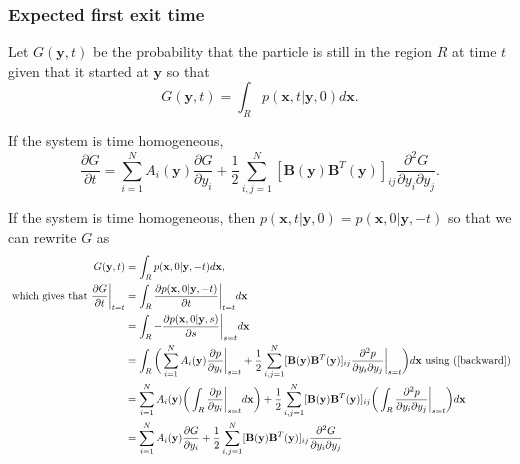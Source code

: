 \documentclass{article}
\newcommand{\mb}{\mathbf}
\begin{document}
\subsubsection{Expected first exit time }
Let $G({\mathbf y},t)$ be the probability that the particle is still in the region $R$ at time $t$ given that it started at ${\mathbf y}$ so that $$G({\mathbf y},t)=\int_Rp({\mathbf x},t|{\mathbf y},0)d{\mathbf x}.$$  

\begin{claim} If the system is time homogeneous,
\begin{equation}
\frac{\partial G}{\partial t}=\sum_{i=1}^NA_i({\mb y})\frac{\partial G}{\partial y_i}+\frac{1}{2}\sum_{i,j=1}^N[{\mb B}({\mb y}){\mb B}^T({\mb y})]_{ij}\frac{\partial^2 G}{\partial y_i\partial y_j}. \label{Geq}
\end{equation}
\end{claim}
\begin{pf}
If the system is time homogeneous, then $p({\mb x},t|{\mb y},0)=p({\mb x},0|{\mb y},-t)$ so that we can rewrite $G$ as 
\begin{align*}
G({\mb y},t)&=\int_Rp({\mb x},0|{\mb y},-t)d{\mb x},
\\ \text{ which gives that } \frac{\partial G}{\partial t}\bigg|_{t=t}&=\int_R\frac{\partial p({\mb x},0|{\mb y},-t)}{\partial t}\bigg|_{t=t}d{\mb x}
\\&=\int_R -\frac{\partial p({\mb x},0|{\mb y},s)}{\partial s}\bigg|_{s=t} d{\mb x}
\\&=\int_R\bigg(\sum_{i=1}^NA_i({\mb y})\frac{\partial p}{\partial y_{i}}\bigg|_{s=t}+\frac{1}{2}\sum_{i,j=1}^N[{\mb B}({\mb y}){\mb B}^T({\mb y})]_{ij}\frac{\partial^2 p}{\partial y_{i}\partial y_{j}}\bigg|_{s=t}\bigg) d{\mb x} \text{ using (\ref{backward})}
\\&=\sum_{i=1}^NA_i({\mb y})\bigg(\int_R\frac{\partial p}{\partial y_{i}}\bigg|_{s=t}d{\mb x}\bigg)+\frac{1}{2}\sum_{i,j=1}^N[{\mb B}({\mb y}){\mb B}^T({\mb y})]_{ij}\bigg(\int_R\frac{\partial^2 p}{\partial y_{i}\partial y_{j}}\bigg|_{s=t}\bigg) d{\mb x}
\\&=\sum_{i=1}^NA_i({\mb y})\frac{\partial G}{\partial y_i}+\frac{1}{2}\sum_{i,j=1}^N[{\mb B}({\mb y}){\mb B}^T({\mb y})]_{ij}\frac{\partial^2 G}{\partial y_i\partial y_j}
\end{align*}
\end{pf}
\end{document}
